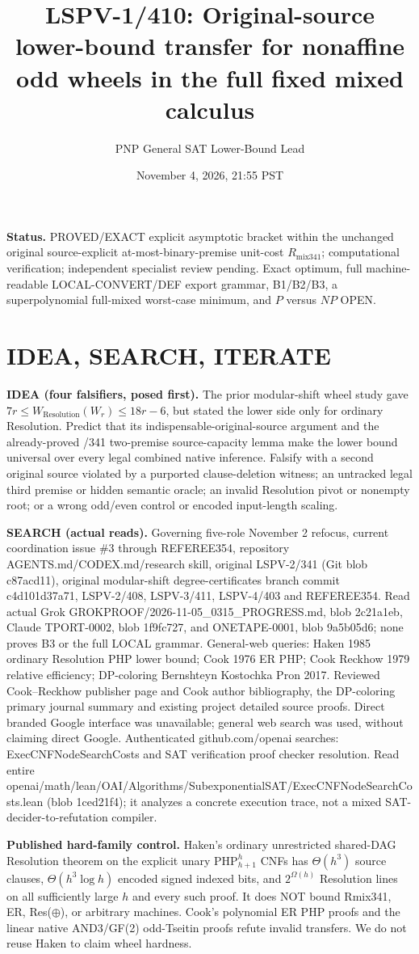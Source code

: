 \documentclass[11pt]{article}
\title{LSPV-1/410: Original-source lower-bound transfer for nonaffine odd wheels in the full fixed mixed calculus}
\author{PNP General SAT Lower-Bound Lead}
\date{November 4, 2026, 21:55 PST}
\begin{document}
\maketitle
\noindent\textbf{Status.} PROVED/EXACT explicit asymptotic bracket within the unchanged original source-explicit at-most-binary-premise unit-cost $R_{\mathrm{mix341}}$; computational verification; independent specialist review pending. Exact optimum, full machine-readable LOCAL-CONVERT/DEF export grammar, B1/B2/B3, a superpolynomial full-mixed worst-case minimum, and $P$ versus $NP$ OPEN.
\section*{IDEA, SEARCH, ITERATE}
\noindent\textbf{IDEA (four falsifiers, posed first).} The prior modular-shift wheel study gave $7r\le W_{\mathrm{Resolution}}(W_r)\le18r-6$, but stated the lower side only for ordinary Resolution. Predict that its indispensable-original-source argument and the already-proved /341 two-premise source-capacity lemma make the lower bound universal over every legal combined native inference. Falsify with a second original source violated by a purported clause-deletion witness; an untracked legal third premise or hidden semantic oracle; an invalid Resolution pivot or nonempty root; or a wrong odd/even control or encoded input-length scaling.
\par\noindent\textbf{SEARCH (actual reads).} Governing five-role November 2 refocus, current coordination issue \#3 through REFEREE354, repository AGENTS.md/CODEX.md/research skill, original LSPV-2/341 (Git blob c87acd11), original modular-shift degree-certificates branch commit c4d101d37a71, LSPV-2/408, LSPV-3/411, LSPV-4/403 and REFEREE354. Read actual Grok GROKPROOF/2026-11-05_0315_PROGRESS.md, blob 2c21a1eb, Claude TPORT-0002, blob 1f9fc727, and ONETAPE-0001, blob 9a5b05d6; none proves B3 or the full LOCAL grammar. General-web queries: Haken 1985 ordinary Resolution PHP lower bound; Cook 1976 ER PHP; Cook Reckhow 1979 relative efficiency; DP-coloring Bernshteyn Kostochka Pron 2017. Reviewed Cook--Reckhow publisher page and Cook author bibliography, the DP-coloring primary journal summary and existing project detailed source proofs. Direct branded Google interface was unavailable; general web search was used, without claiming direct Google. Authenticated github.com/openai searches: ExecCNFNodeSearchCosts and SAT verification proof checker resolution. Read entire openai/math/lean/OAI/Algorithms/SubexponentialSAT/ExecCNFNodeSearchCosts.lean (blob 1ced21f4); it analyzes a concrete execution trace, not a mixed SAT-decider-to-refutation compiler.
\par\noindent\textbf{Published hard-family control.} Haken's ordinary unrestricted shared-DAG Resolution theorem on the explicit unary $\mathrm{PHP}_{h+1}^h$ CNFs has $\Theta(h^3)$ source clauses, $\Theta(h^3\log h)$ encoded signed indexed bits, and $2^{\Omega(h)}$ Resolution lines on all sufficiently large $h$ and every such proof. It does NOT bound Rmix341, ER, Res($\oplus$), or arbitrary machines. Cook's polynomial ER PHP proofs and the linear native AND3/GF(2) odd-Tseitin proofs refute invalid transfers. We do not reuse Haken to claim wheel hardness.
\end{document}
